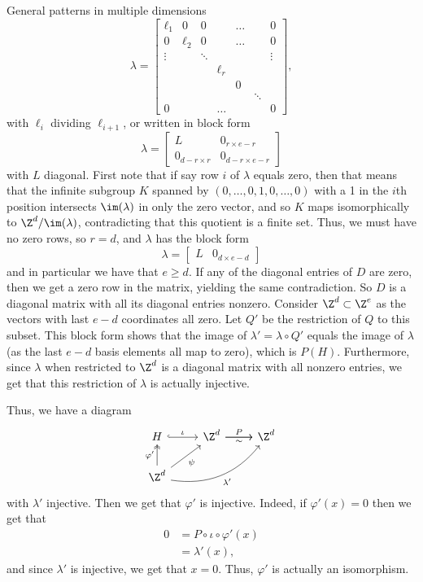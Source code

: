 \documentclass[12nt]{article}
\theoremstyle{plain}
\begin{document}
\begin{subsection}{General patterns in multiple dimensions}
\[
\lambda = \begin{bmatrix}
\ell_1 & 0 & 0 & & \dots & & 0 \\
0  & \ell_2 & 0 & & \dots & & 0 \\
\vdots  &  & \ddots  & & &  &\vdots \\
  &  &  &  \ell_r & \\
  &  &  &  & 0 \\
  &  &  &  &  & \ddots \\
 0 & &  & \dots & & & 0
\end{bmatrix},
\]
with $\ell_i$ dividing $\ell_{i+1}$,
or written in block form 
\[
\lambda = \begin{bmatrix}
 L & 0_{r \times e - r} \\
 0_{d - r \times r} & 0_{d-r \times e-r}
\end{bmatrix}
\]
with $L$ diagonal. First note that if say row $i$ of $\lambda$ equals zero, then that means that the infinite subgroup $K$ spanned by $(0, \dots, 0, 1, 0, \dots, 0)$ with a 1 in the $i$th position intersects $\im(\lambda)$ in only the zero vector, and so $K$ maps isomorphically to $\Z^d/\im(\lambda)$, contradicting that this quotient is a finite set. Thus, we must have no zero rows, so $r = d$, and $\lambda$ has the block form 
\[
\lambda = \begin{bmatrix}L & 0_{d \times {e - d}} \end{bmatrix}
\]
and in particular we have that $e \geq d$. If any of the diagonal entries of $D$ are zero, then we get a zero row in the matrix, yielding the same contradiction. So $D$ is a diagonal matrix with all its diagonal entries nonzero. Consider $\Z^{d} \subset \Z^e$ as the vectors with last $e - d$ coordinates all zero. Let $Q'$ be the restriction of $Q$ to this subset. This block form shows that the image of $\lambda' = \lambda \circ Q'$ equals the image of $\lambda$ (as the last $e - d$ basis elements all map to zero), which is $P(H)$. Furthermore, since $\lambda$ when restricted to $\Z^d$ is a diagonal matrix with all nonzero entries, we get that this restriction of $\lambda$ is actually injective. 

Thus, we have a diagram
\[
\begin{tikzcd}
H  \ar[r, hookrightarrow, "\iota"] & \Z^d \ar[r, "P"] \ar[r, "\sim"'] & \Z^d \\
\Z^d \ar[u, twoheadrightarrow, "\varphi'"] \ar[ur, "\psi"'] \ar[urr, bend right, "\lambda'"']
\end{tikzcd}
\]
with $\lambda'$ injective. Then we get that $\varphi'$ is injective. Indeed, if $\varphi'(x) = 0$ then we get that 
\begin{align*}
0 &= P \circ \iota \circ \varphi'(x) \\
	&= \lambda'(x),
\end{align*}
and since $\lambda'$ is injective, we get that $x = 0$. Thus, $\varphi'$ is actually an isomorphism. 


\end{subsection}
\end{document}
